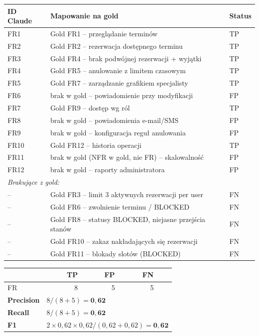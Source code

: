 \documentclass[12pt,a4paper]{article}
\newcommand{\tp}[1]{\colorbox{tpcolor}{\small #1}}
\newcommand{\fp}[1]{\colorbox{fpcolor}{\small #1}}
\newcommand{\fn}[1]{\colorbox{fncolor}{\small #1}}
\begin{document}
\begin{tabular}{p{2.5cm} p{7cm} l}
\toprule
\textbf{ID Claude} & \textbf{Mapowanie na gold} & \textbf{Status} \\
\midrule
FR1 & Gold FR1 -- przeglądanie terminów & \tp{TP} \\
FR2 & Gold FR2 -- rezerwacja dostępnego terminu & \tp{TP} \\
FR3 & Gold FR4 -- brak podwójnej rezerwacji + wyjątki & \tp{TP} \\
FR4 & Gold FR5 -- anulowanie z limitem czasowym & \tp{TP} \\
FR5 & Gold FR7 -- zarządzanie grafikiem specjalisty & \tp{TP} \\
FR6 & brak w gold -- powiadomienie przy modyfikacji & \fp{FP} \\
FR7 & Gold FR9 -- dostęp wg ról & \tp{TP} \\
FR8 & brak w gold -- powiadomienia e-mail/SMS & \fp{FP} \\
FR9 & brak w gold -- konfiguracja reguł anulowania & \fp{FP} \\
FR10 & Gold FR12 -- historia operacji & \tp{TP} \\
FR11 & brak w gold (NFR w gold, nie FR) -- skalowalność & \fp{FP} \\
FR12 & brak w gold -- raporty administratora & \fp{FP} \\
\midrule
\multicolumn{3}{l}{\textit{Brakujące z gold:}} \\
-- & Gold FR3 -- limit 3 aktywnych rezerwacji per user & \fn{FN} \\
-- & Gold FR6 -- zwolnienie terminu / BLOCKED & \fn{FN} \\
-- & Gold FR8 -- statusy BLOCKED, niejasne przejścia stanów & \fn{FN} \\
-- & Gold FR10 -- zakaz nakładających się rezerwacji & \fn{FN} \\
-- & Gold FR11 -- blokady slotów (BLOCKED) & \fn{FN} \\
\bottomrule
\end{tabular}

\vspace{0.5em}
\begin{tabular}{lrrrr}
\toprule
& \textbf{TP} & \textbf{FP} & \textbf{FN} & \\
\midrule
FR & 8 & 5 & 5 & \\
\midrule
\textbf{Precision} & \multicolumn{4}{l}{$8 / (8+5) = \mathbf{0{,}62}$} \\
\textbf{Recall}    & \multicolumn{4}{l}{$8 / (8+5) = \mathbf{0{,}62}$} \\
\textbf{F1}        & \multicolumn{4}{l}{$2 \times 0{,}62 \times 0{,}62 / (0{,}62+0{,}62) = \mathbf{0{,}62}$} \\
\bottomrule
\end{tabular}
\end{document}
